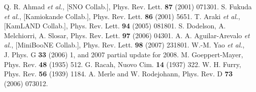 \begin{thebibliography}{99}
Q. R. Ahmad \textit{et al.}, [SNO Collab.], Phys. Rev.   Lett. \textbf{87} (2001) 071301.
S. Fukuda \textit{et al.}, [Kamiokande Collab.], Phys.   Rev. Lett. \textbf{86} (2001) 5651.
T. Araki \textit{et al.}, [KamLAND Collab.], Phys. Rev.   Lett. \textbf{94} (2005) 081801.
S. Dodelson, A. Melchiorri, A. Slosar, Phys. Rev. Lett.   \textbf{97} (2006) 04301.
A. A. Aguilar-Arevalo \textit{et al.}, [MiniBooNE   Collab.], Phys. Rev. Lett. \textbf{98} (2007) 231801.
W.-M. Yao \textit{et al.}, J. Phys. G \textbf{33}   (2006) 1, and 2007 partial update for 2008.
M. Goeppert-Mayer, Phys. Rev. \textbf{48} (1935) 512.
G. Racah, Nuovo Cim. \textbf{14} (1937) 322.
W. H. Furry, Phys. Rev. \textbf{56} (1939) 1184.
A. Merle and W. Rodejohann, Phys. Rev. D \textbf{73} (2006) 073012.

\end{thebibliography}


